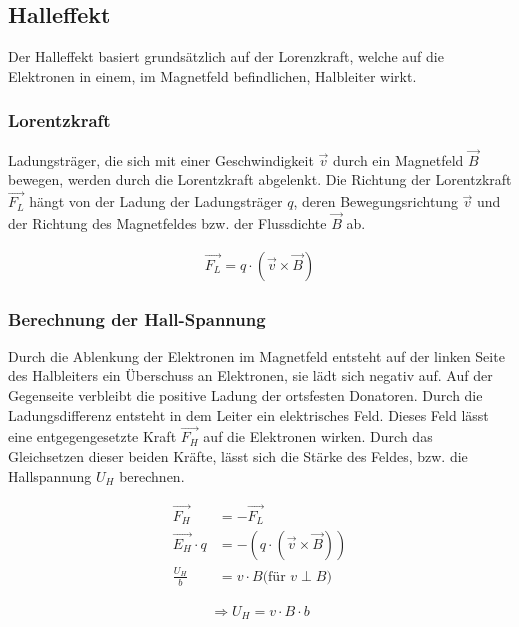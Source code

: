 \documentclass[a4paper]{scrartcl}
\numberwithin{equation}{subsection}
\begin{document}
\subsection{Halleffekt}
Der Halleffekt basiert grundsätzlich auf der Lorenzkraft, welche auf die Elektronen in einem, im Magnetfeld befindlichen, Halbleiter wirkt.

\subsubsection{Lorentzkraft}
Ladungsträger, die sich mit einer Geschwindigkeit $\overrightarrow{v}$ durch ein Magnetfeld $\overrightarrow{B}$ bewegen, werden durch die Lorentzkraft abgelenkt. 
Die Richtung der Lorentzkraft $\overrightarrow{F_L}$ hängt von der Ladung der Ladungsträger $q$, deren Bewegungsrichtung $\overrightarrow{v}$ und der Richtung des Magnetfeldes bzw. der Flussdichte $\overrightarrow{B}$ ab. \cite{anl}

\begin{align}
\overrightarrow{F_L} = q \cdot (\overrightarrow{v} \times \overrightarrow{B})
\end{align}

\subsubsection{Berechnung der Hall-Spannung}

Durch die Ablenkung der Elektronen im Magnetfeld entsteht auf der linken Seite des Halbleiters ein Überschuss an Elektronen, sie lädt sich negativ auf. Auf der Gegenseite verbleibt die positive Ladung der ortsfesten Donatoren. Durch die Ladungsdifferenz entsteht in dem Leiter ein elektrisches Feld. Dieses Feld lässt eine entgegengesetzte Kraft $\overrightarrow{F_H}$ auf die Elektronen wirken. Durch das Gleichsetzen dieser beiden Kräfte, lässt sich die Stärke des Feldes, bzw. die Hallspannung $U_H$ berechnen. \cite{anl}

\begin{align}
\overrightarrow{F_H} &= -\overrightarrow{F_L} \\
\overrightarrow{E_H} \cdot q &= -(q \cdot (\overrightarrow{v} \times \overrightarrow{B})) \\
\frac{U_H}{b} &= v \cdot B \text{(für $v \perp B$)}
\end{align}

\begin{align}
\Rightarrow U_H = v \cdot B \cdot b
\end{align}
\end{document}
